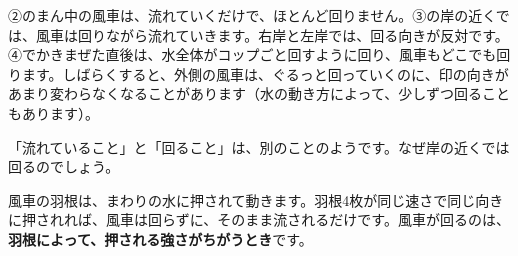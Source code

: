 \noindent ②のまん中の風車は、流れていくだけで、ほとんど回りません。③の岸の近くでは、風車は回りながら流れていきます。右岸と左岸では、回る向きが反対です。④でかきまぜた直後は、水全体がコップごと回すように回り、風車もどこでも回ります。しばらくすると、外側の風車は、ぐるっと回っていくのに、印の向きがあまり変わらなくなることがあります（水の動き方によって、少しずつ回ることもあります）。

「流れていること」と「回ること」は、別のことのようです。なぜ岸の近くでは回るのでしょう。






\leavevmode\label{bk:8-10:fusha}風車の羽根は、まわりの水に押されて動きます。羽根4枚が同じ速さで同じ向きに押されれば、風車は回らずに、そのまま流されるだけです。風車が回るのは、\textbf{羽根によって、押される強さがちがうとき}です。

